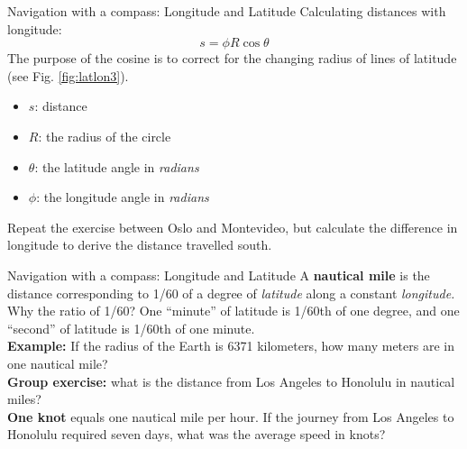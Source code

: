 \documentclass{beamer}
\begin{document}
\begin{frame}{Navigation with a compass: Longitude and Latitude}
Calculating distances with longitude:
\begin{equation}
s = \phi R \cos\theta \label{eq:latlon2}
\end{equation}
The purpose of the cosine is to correct for the changing radius of lines of latitude (see Fig. \ref{fig:latlon3}).
\begin{itemize}
\item $s$: distance
\item $R$: the radius of the circle
\item $\theta$: the latitude angle in \textit{radians}
\item $\phi$: the longitude angle in \textit{radians}
\end{itemize}
Repeat the exercise between Oslo and Montevideo, but calculate the difference in longitude to derive the distance travelled south.
\end{frame}

\begin{frame}{Navigation with a compass: Longitude and Latitude}
\small
A \textbf{nautical mile} is the distance corresponding to 1/60 of a degree of \textit{latitude} along a constant \textit{longitude.}  Why the ratio of 1/60?  One ``minute'' of latitude is 1/60th of one degree, and one ``second'' of latitude is 1/60th of one minute. \\ \vspace{0.75cm}
\textbf{Example:} If the radius of the Earth is 6371 kilometers, how many meters are in one nautical mile? \\ \vspace{0.75cm}
\textbf{Group exercise:} what is the distance from Los Angeles to Honolulu in nautical miles? \\ \vspace{0.75cm}
\textbf{One knot} equals one nautical mile per hour.  If the journey from Los Angeles to Honolulu required seven days, what was the average speed in knots?
\end{frame}
\end{document}
